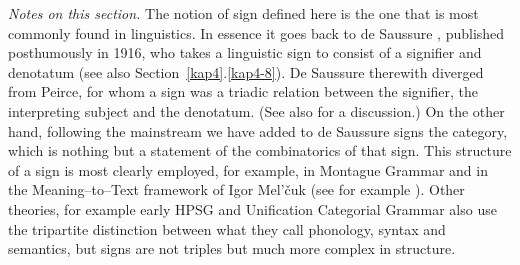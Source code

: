 {\it Notes on this section.} The notion of sign defined here is
the one that is most commonly found in linguistics. In essence
it goes back to de Saussure , 
published posthumously in 1916, who takes a linguistic 
sign to consist of a signifier and denotatum 
(see also Section~\ref{kap4}.\ref{kap4-8}). De Saussure therewith diverged 
from Peirce, 
for whom a sign was a triadic relation between the signifier, the 
interpreting subject and the denotatum. (See also \cite{lyons:semantics}
for a discussion.) On the other hand, following the mainstream we 
have added to de Saussure signs the category, which is nothing but 
a statement of the combinatorics of that sign. This structure of a 
sign is most clearly employed, for example, in Montague Grammar and 
in the Meaning--to--Text framework of Igor Mel'\v{c}uk 
(see for example \cite{melcuk:morphologie}). Other theories, 
for example early HPSG 
and Unification Categorial Grammar also use the tripartite distinction 
between what they call phonology, syntax and semantics, but signs 
are not triples but much more complex in structure.

